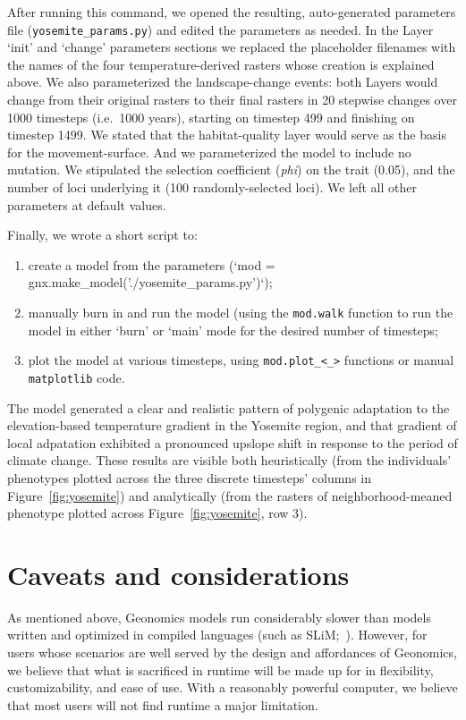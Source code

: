 ﻿\documentclass{article}
\begin{document}
After running this command, we opened the resulting, auto-generated parameters
file (\texttt{yosemite\_params.py}) and edited the parameters as needed.
In the Layer `init' and `change' parameters sections we replaced
the placeholder filenames with the names of the four temperature-derived
rasters whose creation is explained above.
We also parameterized the landscape-change events:
both Layers would change from their original rasters to their final
rasters in 20 stepwise changes over 1000 timesteps (i.e.\ 1000 years),
starting on timestep 499 and finishing on timestep 1499.
We stated that the habitat-quality layer would serve as the basis for the movement-surface.
And we parameterized the model to include no mutation.
We stipulated the selection coefficient (\emph{phi}) on the trait (0.05),
and the number of loci underlying it (100 randomly-selected loci).
We left all other parameters at default values.

Finally, we wrote a short script to:
\begin{enumerate}
  \item create a model from the parameters (`mod = gnx.make\_model('./yosemite\_params.py')`);
  \item manually burn in and run the model (using the \texttt{mod.walk} function to run the model
in either `burn' or `main' mode for the desired number of timesteps;
  \item plot the model at various timesteps, using \texttt{mod.plot\_<\_>} functions or manual \texttt{matplotlib} code.
\end{enumerate}

The model generated a clear and realistic pattern of polygenic adaptation to
the elevation-based temperature gradient in the Yosemite region, and that
gradient of local adpatation exhibited a pronounced upslope shift in response to
the period of climate change. These results are visible both heuristically
(from the individuals' phenotypes plotted across the three discrete timesteps' columns
in Figure~\ref{fig:yosemite})
and analytically (from the rasters of neighborhood-meaned phenotype plotted across
Figure~\ref{fig:yosemite}, row 3).


\section{Caveats and considerations}
As mentioned above, Geonomics models run considerably slower than models
written and optimized in compiled languages (such as SLiM;~\cite{messer,haller}).
However, for users whose scenarios are well served by the design
and affordances of Geonomics, we believe that what is sacrificed in
runtime will be made up for in flexibility, customizability, and ease of use.
With a reasonably powerful computer, we believe that most users
will not find runtime a major limitation.
\end{document}
